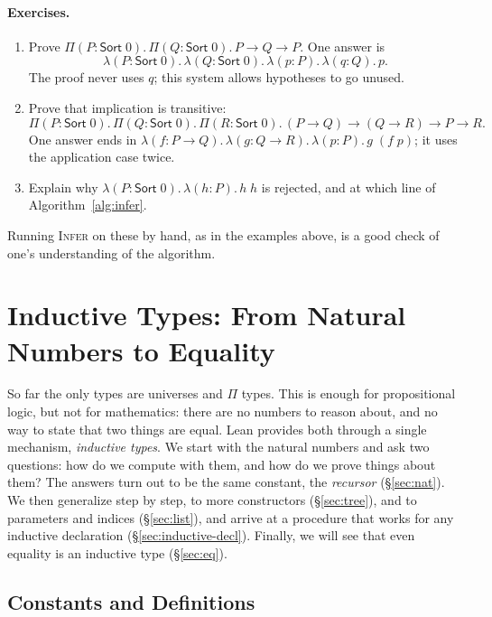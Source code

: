 \documentclass[acmsmall,screen,nonacm]{acmart}
\newcommand{\Sort}[1]{\mathsf{Sort}\;#1}
\newcommand{\tPi}[3]{\Pi(#1{:}#2).\,#3}
\newcommand{\tLam}[3]{\lambda(#1{:}#2).\,#3}
\begin{document}
\paragraph{Exercises.}
\begin{enumerate}[nosep, label=\arabic*.]
  \item Prove $\tPi{P}{\Sort{0}}{\tPi{Q}{\Sort{0}}{P \to Q \to P}}$.
    One answer is
    \[\tLam{P}{\Sort{0}}{\tLam{Q}{\Sort{0}}{\tLam{p}{P}{\tLam{q}{Q}{p}}}}.\]
    The proof never uses $q$; this system allows hypotheses to go unused.
  \item Prove that implication is transitive:
    \[\tPi{P}{\Sort{0}}{\tPi{Q}{\Sort{0}}{\tPi{R}{\Sort{0}}{(P \to Q) \to (Q \to R) \to P \to R}}}.\]
    One answer ends in $\tLam{f}{P \to Q}{\tLam{g}{Q \to R}{\tLam{p}{P}{g\;(f\;p)}}}$; it uses the application case twice.
  \item Explain why $\tLam{P}{\Sort{0}}{\tLam{h}{P}{h\;h}}$ is rejected, and at which line of Algorithm~\ref{alg:infer}.
\end{enumerate}
Running \textsc{Infer} on these by hand, as in the examples above, is a good check of one's understanding of the algorithm.

\section{Inductive Types: From Natural Numbers to Equality}
\label{sec:inductive}

So far the only types are universes and $\Pi$ types.
This is enough for propositional logic, but not for mathematics: there are no numbers to reason about, and no way to state that two things are equal.
Lean provides both through a single mechanism, \emph{inductive types}.
We start with the natural numbers and ask two questions: how do we compute with them, and how do we prove things about them?
The answers turn out to be the same constant, the \emph{recursor} (\S\ref{sec:nat}).
We then generalize step by step, to more constructors (\S\ref{sec:tree}), and to parameters and indices (\S\ref{sec:list}),
and arrive at a procedure that works for any inductive declaration (\S\ref{sec:inductive-decl}).
Finally, we will see that even equality is an inductive type (\S\ref{sec:eq}).

\subsection{Constants and Definitions}
\label{sec:constants}
\end{document}
